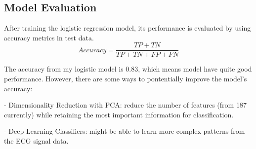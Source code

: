 \documentclass{article}
\begin{document}
\subsection{Model Evaluation} 
After training the logistic regression model, its performance is evaluated by using accuracy metrics in test data. 
 \begin{equation} Accuracy = \frac{TP+TN}{TP+TN+FP+FN}\end{equation}

 The accuracy from my logistic model is 0.83, which means model have quite good performance. However, there are some ways to pontentially improve the model's accuracy:

- Dimensionality Reduction with PCA: reduce the number of features (from 187 currently) while retaining the most important information for classification.

- Deep Learning Classifiers: might be able to learn more complex patterns from the ECG signal data.
\end{document}
